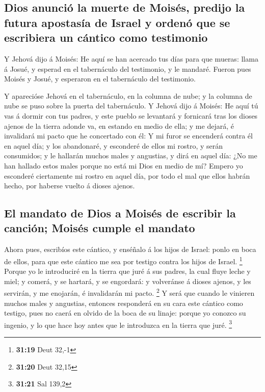 \hypertarget{dios-anunciuxf3-la-muerte-de-moisuxe9s-predijo-la-futura-apostasuxeda-de-israel-y-ordenuxf3-que-se-escribiera-un-cuxe1ntico-como-testimonio}{%
\subsection{Dios anunció la muerte de Moisés, predijo la futura
apostasía de Israel y ordenó que se escribiera un cántico como
testimonio}\label{dios-anunciuxf3-la-muerte-de-moisuxe9s-predijo-la-futura-apostasuxeda-de-israel-y-ordenuxf3-que-se-escribiera-un-cuxe1ntico-como-testimonio}}

 Y Jehová dijo á Moisés: He aquí se han acercado tus días
para que mueras: llama á Josué, y esperad en el tabernáculo del
testimonio, y le mandaré. Fueron pues Moisés y Josué, y esperaron en el
tabernáculo del testimonio.

 Y aparecióse Jehová en el tabernáculo, en la columna de
nube; y la columna de nube se puso sobre la puerta del tabernáculo.
 Y Jehová dijo á Moisés: He aquí tú vas á dormir con tus
padres, y este pueblo se levantará y fornicará tras los dioses ajenos de
la tierra adonde va, en estando en medio de ella; y me dejará, é
invalidará mi pacto que he concertado con él:  Y mi furor
se encenderá contra él en aquel día; y los abandonaré, y esconderé de
ellos mi rostro, y serán consumidos; y le hallarán muchos males y
angustias, y dirá en aquel día: ¿No me han hallado estos males porque no
está mi Dios en medio de mí?  Empero yo esconderé
ciertamente mi rostro en aquel día, por todo el mal que ellos habrán
hecho, por haberse vuelto á dioses ajenos.

\hypertarget{el-mandato-de-dios-a-moisuxe9s-de-escribir-la-canciuxf3n-moisuxe9s-cumple-el-mandato}{%
\subsection{El mandato de Dios a Moisés de escribir la canción; Moisés
cumple el
mandato}\label{el-mandato-de-dios-a-moisuxe9s-de-escribir-la-canciuxf3n-moisuxe9s-cumple-el-mandato}}

 Ahora pues, escribíos este cántico, y enséñalo á los
hijos de Israel: ponlo en boca de ellos, para que este cántico me sea
por testigo contra los hijos de Israel. \footnote{\textbf{31:19} Deut
  32,-1}  Porque yo le introduciré en la tierra que juré
á sus padres, la cual fluye leche y miel; y comerá, y se hartará, y se
engordará: y volveránse á dioses ajenos, y les servirán, y me enojarán,
é invalidarán mi pacto. \footnote{\textbf{31:20} Deut 32,15}
 Y será que cuando le vinieren muchos males y angustias,
entonces responderá en su cara este cántico como testigo, pues no caerá
en olvido de la boca de su linaje: porque yo conozco su ingenio, y lo
que hace hoy antes que le introduzca en la tierra que juré. \footnote{\textbf{31:21}
  Sal 139,2}

